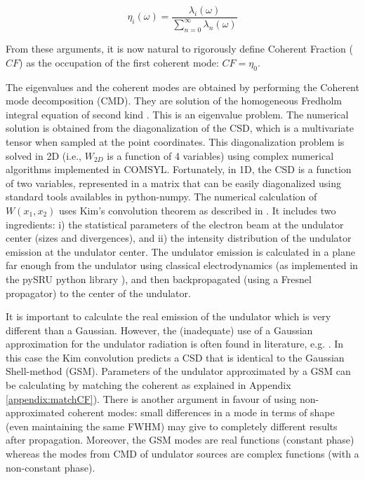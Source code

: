 \documentclass{iucr}              %
\begin{document}
\begin{equation}
\eta_i(\omega) = \frac{\lambda_i(\omega)}{\sum_{n=0}^{\infty} \lambda_n(\omega)}
\end{equation}

From these arguments, it is now natural to rigorously define Coherent Fraction ($CF$) as the occupation of the first coherent mode: $CF=\eta_0$.

The eigenvalues and the coherent modes are obtained by performing the Coherent mode decomposition (CMD). They are solution of the homogeneous Fredholm integral equation of second kind \cite{glass2017}. This is an eigenvalue problem. The numerical solution is obtained from the diagonalization of the CSD, which is a multivariate tensor when sampled at the point coordinates. This diagonalization problem is solved in 2D (i.e., $W_{2D}$ is a function of 4 variables) using complex numerical algorithms implemented in COMSYL. Fortunately, in 1D, the CSD is a function of two variables, represented in a matrix that can be easily diagonalized using standard tools availables in python-numpy. The numerical calculation of $W(x_1,x_2)$ uses Kim's convolution theorem \cite{kim1986b} as described in \cite{glass2017}. It includes two ingredients: i) the statistical parameters of the electron beam at the undulator center (sizes and divergences), and ii) the intensity distribution of the undulator emission at the undulator center. The undulator emission is calculated in a plane far enough from the undulator using classical electrodynamics \cite{jackson} (as implemented in the pySRU python library \cite{pySRU}), and then backpropagated (using a Fresnel propagator) to the center of the undulator. 

It is important to calculate the real emission of the undulator which is very different than a Gaussian. However, the (inadequate) use of a Gaussian approximation for the undulator radiation is often found in literature, e.g.  \cite{coisson1997}. In this case the Kim convolution predicts a CSD that is identical to the Gaussian Shell-method (GSM). Parameters of the undulator approximated by a GSM can be calculating by matching the coherent as explained in Appendix \ref{appendix:matchCF}). There is another argument in favour of using non-approximated coherent modes: small differences in a mode in terms of shape (even maintaining the same FWHM) may give to completely different results after propagation. Moreover, the GSM modes are real functions (constant phase) whereas the modes from CMD of undulator sources are complex functions (with a non-constant phase).
\end{document}
